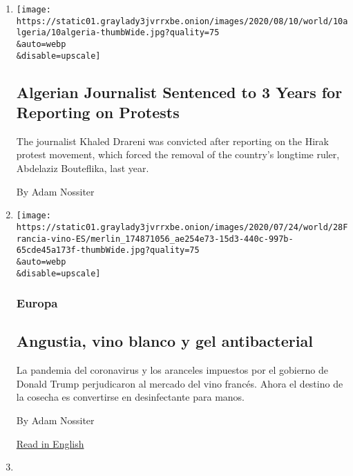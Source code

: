 \begin{enumerate}
\def\labelenumi{\arabic{enumi}.}
\item
  \href{/2020/08/10/world/africa/Algerian-journalist-Khaled-Drareni-convicted.html}{}

  \texttt{[image: https://static01.graylady3jvrrxbe.onion/images/2020/08/10/world/10algeria/10algeria-thumbWide.jpg?quality=75\\\&auto=webp\\\&disable=upscale]}

  \hypertarget{algerian-journalist-sentenced-to-3-years-for-reporting-on-protests}{%
  \subsection{Algerian Journalist Sentenced to 3 Years for Reporting on
  Protests}\label{algerian-journalist-sentenced-to-3-years-for-reporting-on-protests}}

  The journalist Khaled Drareni was convicted after reporting on the
  Hirak protest movement, which forced the removal of the country's
  longtime ruler, Abdelaziz Bouteflika, last year.

  By Adam Nossiter
\item
  \href{/es/2020/07/28/espanol/mundo/vino-blanco-alsacia-coronavirus.html}{}

  \texttt{[image: https://static01.graylady3jvrrxbe.onion/images/2020/07/24/world/28Francia-vino-ES/merlin\_174871056\_ae254e73-15d3-440c-997b-65cde45a173f-thumbWide.jpg?quality=75\\\&auto=webp\\\&disable=upscale]}

  \hypertarget{europa}{%
  \subsubsection{Europa}\label{europa}}

  \hypertarget{angustia-vino-blanco-y-gel-antibacterial}{%
  \subsection{Angustia, vino blanco y gel
  antibacterial}\label{angustia-vino-blanco-y-gel-antibacterial}}

  La pandemia del coronavirus y los aranceles impuestos por el gobierno
  de Donald Trump perjudicaron al mercado del vino francés. Ahora el
  destino de la cosecha es convertirse en desinfectante para manos.

  By Adam Nossiter

  \href{https://www.nytimes3xbfgragh.onion/2020/07/27/world/europe/france-alsace-wine-coronavirus.html}{Read
  in English}
\item
  \href{/2020/07/27/world/europe/france-alsace-wine-coronavirus.html}{}


\end{enumerate}
